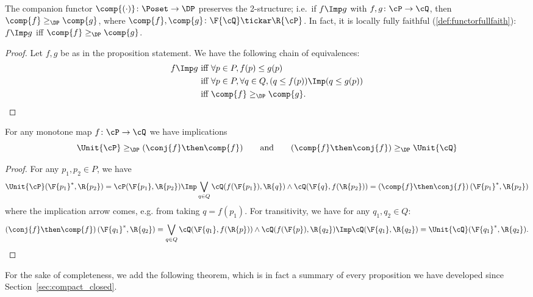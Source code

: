 \begin{proposition}\label{prop:companion_2}
The companion functor $\comp{(\cdot)}\colon\Poset\to\DP$ preserves the 2-structure; i.e.\ if $f\Imp g$ with $f,g\colon \cP \to\cQ $, then $\comp{f}\geq_\DP\comp{g}$, where $\comp{f},\comp{g}\colon \F{\cQ} \tickar\R{\cP}$. In fact, it is locally fully faithful (\cref{def:functorfullfaith}): $f\Imp g$ iff $\comp{f}\geq_\DP \comp{g}$.
\end{proposition}
\begin{proof}
Let $f,g$ be as in the proposition statement. We have the following chain of equivalences:
\begin{equation}
\begin{aligned}
	f\Imp g&\text{ iff }
	\forall p\in P, f(p)\leq g(p)\\&\text{ iff }
	\forall p\in P, \forall q\in Q, (q\leq f(p))\Imp (q\leq g(p))\\&\text{ iff }
	\comp{f}\geq_\DP \comp{g}.
\end{aligned}
\end{equation}
\end{proof}

\begin{proposition}\label{prop:comp_conj_adj}
For any monotone map $f\colon\cP \to\cQ $ we have implications
\begin{equation}
\Unit{\cP }\geq_\DP (\conj{f}\then \comp{f})
\qquad\text{and}\qquad
(\comp{f}\then \conj{f})\geq_\DP \Unit{\cQ }
\end{equation}
\end{proposition}
\begin{proof}
For any $p_1,p_2\in P$, we have
\begin{equation}
	\Unit{\cP }(\F{p_1}^*,\R{p_2})=\cP (\F{p_1},\R{p_2})
	\Imp\bigvee_{q\in Q}\cQ (f(\F{p_1}),\R{q})\wedge\cQ (\F{q},f(\R{p_2}))=\left(\comp{f}\then \conj{f}\right)(\F{p_1}^*,\R{p_2})
\end{equation}
where the implication arrow comes, e.g. from taking $q=f(p_1)$. For transitivity, we have for any $q_1,q_2\in Q$:
\begin{equation}
	\left(\conj{f}\then \comp{f}\right)(\F{q_1}^*,\R{q_2})=\bigvee_{q\in Q}\cQ (\F{q_1},f(\R{p}))\wedge\cQ (f(\F{p}),\R{q_2})
	\Imp\cQ (\F{q_1},\R{q_2})=\Unit{\cQ }(\F{q_1}^*,\R{q_2}).
\end{equation}
\end{proof}

For the sake of completeness, we add the following theorem, which is in fact a summary of every proposition we have developed since Section~\ref{sec:compact_closed}.


